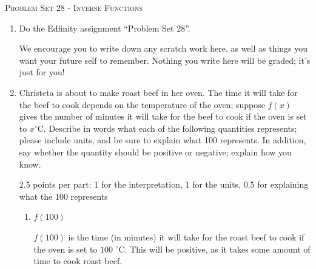 \documentclass{article}
\newcommand{\doedfinity}[2][\newpage]{
  \begin{problem}[#1]
    Do the Edfinity assignment ``Problem Set #2''.

    We encourage you to write down any scratch work here, as well as
    things you want your future self to remember. Nothing you write
    here will be graded; it's just for you!
  \end{problem}
}
\begin{document}
\begin{center}
  \large\textsc{Problem Set 28 - Inverse Functions}
\end{center}

\begin{enumerate}
\item  {}

  \doedfinity{28}

\item  

  Christeta is about to make roast beef in her oven. The time it will take for the beef to cook depends on the temperature of the oven; suppose $f(x)$ gives the number of minutes it will take for the beef to cook if the oven is set to $x^\circ$C. Describe in words what each of the following quantities represents; please include units, and be sure to explain what 100 represents. In addition, say whether the quantity should be positive or negative; explain how you know. 

  \begin{grading}
    2.5 points per part: 1 for the interpretation, 1 for the units, 0.5 for explaining what the 100 represents
  \end{grading}

  \begin{enumerate}
  \item
    \begin{problem}[\vfill]
      $f(100)$
    \end{problem}

    \begin{solution}
      $f(100)$ is the time (in minutes) it will take for the roast beef to cook
      if the oven is set to $100$ $^\circ$C. This will be positive,
      as it takes some amount of time to cook roast beef.
    \end{solution}


\end{enumerate}
\end{enumerate}
\end{document}
